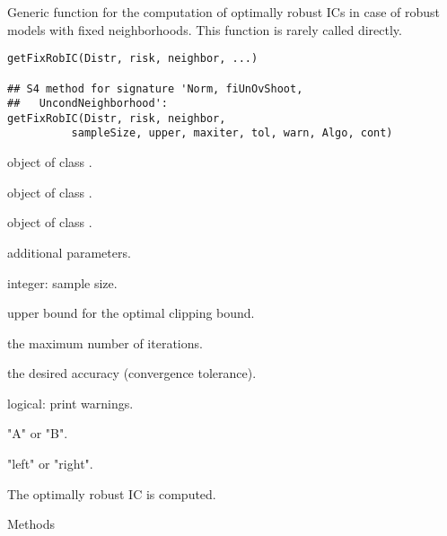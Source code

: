 \begin{Description}\relax
Generic function for the computation of optimally robust ICs 
in case of robust models with fixed neighborhoods. This function is 
rarely called directly.
\end{Description}
\begin{Usage}
\begin{verbatim}
getFixRobIC(Distr, risk, neighbor, ...)

## S4 method for signature 'Norm, fiUnOvShoot,
##   UncondNeighborhood':
getFixRobIC(Distr, risk, neighbor, 
          sampleSize, upper, maxiter, tol, warn, Algo, cont)
\end{verbatim}
\end{Usage}
\begin{Arguments}
\begin{ldescription}
\item[\code{Distr}] object of class . 
\item[\code{risk}] object of class . 
\item[\code{neighbor}] object of class . 
\item[\code{...}] additional parameters. 
\item[\code{sampleSize}] integer: sample size. 
\item[\code{upper}] upper bound for the optimal clipping bound. 
\item[\code{maxiter}] the maximum number of iterations. 
\item[\code{tol}] the desired accuracy (convergence tolerance).
\item[\code{warn}] logical: print warnings. 
\item[\code{Algo}] "A" or "B". 
\item[\code{cont}] "left" or "right". 
\end{ldescription}
\end{Arguments}
\begin{Value}
The optimally robust IC is computed.
\end{Value}
\begin{Section}{Methods}
\end{Section}
